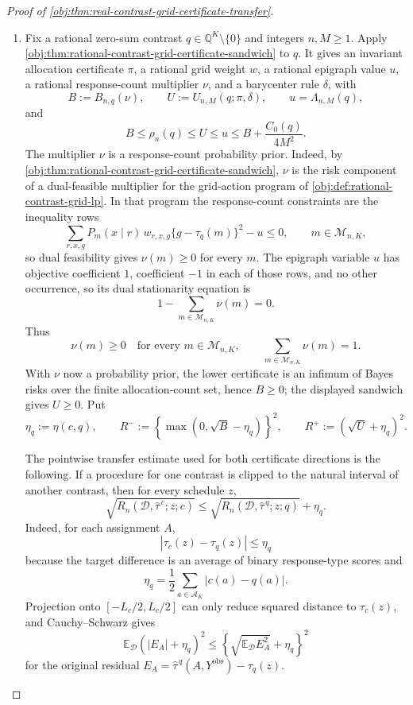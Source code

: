 \documentclass[11pt]{article}
\begin{document}
\begin{proof}[Proof of \cref{obj:thm:real-contrast-grid-certificate-transfer}]
\begin{enumerate}
\item\label{it:real-contrast-finite-grid-transfer} Fix a rational zero-sum contrast \(q\in\mathbb Q^K\setminus\{0\}\) and integers \(n,M\ge 1\).  Apply \cref{obj:thm:rational-contrast-grid-certificate-sandwich} to \(q\).  It gives an invariant allocation certificate \(\pi\), a rational grid weight \(w\), a rational epigraph value \(u\), a rational response-count multiplier \(\nu\), and a barycenter rule \(\delta\), with
\[
B:=B_{n,q}(\nu),\qquad
U:=U_{n,M}(q;\pi,\delta),\qquad
u=\Lambda_{n,M}(q),
\]
and
\[
B\le \rho_n(q)\le U\le u
\le B+\frac{C_0(q)}{4M^2}.
\]
The multiplier \(\nu\) is a response-count probability prior.  Indeed, by \cref{obj:thm:rational-contrast-grid-certificate-sandwich}, \(\nu\) is the risk component of a dual-feasible multiplier for the grid-action program of \cref{obj:def:rational-contrast-grid-lp}.  In that program the response-count constraints are the inequality rows
\[
\sum_{r,x,g}P_m(x\mid r)\,w_{r,x,g}\{g-\tau_q(m)\}^2-u\le 0,
\qquad m\in\mathcal M_{n,K},
\]
so dual feasibility gives \(\nu(m)\ge0\) for every \(m\).  The epigraph variable \(u\) has objective coefficient \(1\), coefficient \(-1\) in each of those rows, and no other occurrence, so its dual stationarity equation is
\[
1-\sum_{m\in\mathcal M_{n,K}}\nu(m)=0.
\]
Thus
\[
\nu(m)\ge0\quad\text{for every }m\in\mathcal M_{n,K},
\qquad
\sum_{m\in\mathcal M_{n,K}}\nu(m)=1.
\]
With \(\nu\) now a probability prior, the lower certificate is an infimum of Bayes risks over the finite allocation-count set, hence \(B\ge0\); the displayed sandwich gives \(U\ge0\).  Put
\[
\eta_q:=\eta(c,q),\qquad
R^-:=\left\{\max(0,\sqrt B-\eta_q)\right\}^2,\qquad
R^+:=(\sqrt U+\eta_q)^2 .
\]

The pointwise transfer estimate used for both certificate directions is the following.  If a procedure for one contrast is clipped to the natural interval of another contrast, then for every schedule \(z\),
\[
\sqrt{R_n(\mathcal D,\widehat\tau^{\,c};z;c)}
\le
\sqrt{R_n(\mathcal D,\widehat\tau^{\,q};z;q)}+\eta_q .
\]
Indeed, for each assignment \(A\),
\[
|\tau_c(z)-\tau_q(z)|\le \eta_q
\]
because the target difference is an average of binary response-type scores and
\[
\eta_q=\frac12\sum_{a\in\mathcal A_K}|c(a)-q(a)|.
\]
Projection onto \([-L_c/2,L_c/2]\) can only reduce squared distance to \(\tau_c(z)\), and Cauchy--Schwarz gives
\[
\mathbb E_{\mathcal D}\!\left(|E_A|+\eta_q\right)^2
\le
\left\{\sqrt{\mathbb E_{\mathcal D}E_A^2}+\eta_q\right\}^2
\]
for the original residual \(E_A=\widehat\tau^{\,q}(A,Y^{\mathrm{obs}})-\tau_q(z)\).


\end{enumerate}
\end{proof}
\end{document}
